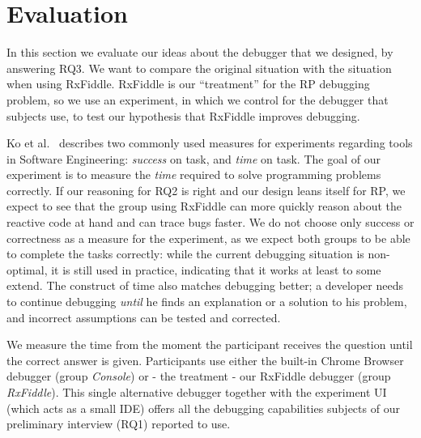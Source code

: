 \section{Evaluation}
\label{section-evaluation}

In this section we evaluate our ideas about the debugger that we designed, by answering RQ3. 
We want to compare the original situation with the situation when using RxFiddle. 
RxFiddle is our ``treatment'' for the RP debugging problem, so we use an experiment, in which we control for the debugger that subjects use, to test our hypothesis that RxFiddle improves debugging.

Ko et al.~\cite{ko2015practical} describes two commonly used measures for experiments regarding tools in Software Engineering: \emph{success} on task, and \emph{time} on task.
The goal of our experiment is to measure the \textit{time} required to solve programming problems correctly.
If our reasoning for RQ2 is right and our design leans itself for RP, we expect to see that the group using RxFiddle can more quickly reason about the reactive code at hand and can trace bugs faster.
We do not choose only success or correctness as a measure for the experiment, as we expect both groups to be able to complete the tasks correctly: while the current debugging situation is non-optimal, it is still used in practice, indicating that it works at least to some extend.
The construct of time also matches debugging better; a developer needs to continue debugging \textit{until} he finds an explanation or a solution to his problem, and incorrect assumptions can be tested and corrected. 

We measure the time from the moment the participant receives the question until the correct answer is given. Participants use either the built-in Chrome Browser debugger (group \emph{Console}) or - the treatment - our RxFiddle debugger (group \emph{RxFiddle}). This single alternative debugger together with the experiment UI (which acts as a small IDE) offers all the debugging capabilities subjects of our preliminary interview (RQ1) reported to use.

